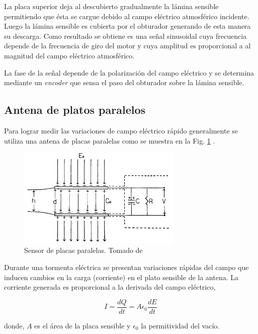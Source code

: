 \documentclass[12pt,a4paper,oneside]{book}
\begin{document}
La placa superior deja al descubierto gradualmente la lámina sensible permitiendo que ésta se cargue debido al campo eléctrico atmosférico incidente. Luego la lámina sensible es cubierta por el obturador generando de esta manera su descarga. Como resultado se obtiene es una señal sinusoidal cuya frecuencia depende de la frecuencia de giro del motor y cuya amplitud es proporcional a al magnitud del campo eléctrico atmosférico.

La fase de la señal depende de la polarización del campo eléctrico y se determina mediante un \textit{encoder} que sensa el paso del obturador sobre la lámina sensible.

\subsection{Antena de platos paralelos}

Para lograr medir las variaciones de campo eléctrico rápido generalmente se utiliza una antena de placas paralelas como se muestra en la Fig. \ref{figc} \cite{ogawa1973analyses}. 

\begin{figure}[h!]
  \centering
  \includegraphics[width=0.7\textwidth]{Cap.png}
  \caption{ Sensor de placas paralelas. Tomado de  \cite{ogawa1973analyses} }
  \label{figc}
\end{figure}

Durante una tormenta eléctrica se presentan variaciones rápidas del campo que inducen cambios en la carga (corriente) en el plato sensible de la antena. La corriente generada es proporcional a la derivada del campo eléctrico,

\begin{equation}
    I = \frac{dQ}{dt} = A\epsilon_0 \frac{dE}{dt} 
\end{equation}

donde, $A$ es el área de la placa sensible y $\epsilon_0$ la permitividad del vacío.
\end{document}
